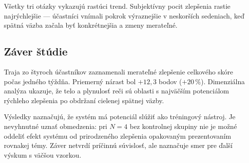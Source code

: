 Všetky tri otázky vykazujú rastúci trend. Subjektívny pocit zlepšenia rastie najrýchlejšie --- účastníci vnímali pokrok výraznejšie v neskorších sedeniach, keď spätná väzba začala byť konkrétnejšia a zmeny merateľné.

\subsection{Záver štúdie}

Traja zo štyroch účastníkov zaznamenali merateľné zlepšenie celkového skóre počas jedného týždňa. Priemerný nárast bol $+12{,}3$ bodov ($+20\,\%$). Dimenziálna analýza ukazuje, že telo a plynulosť reči sú oblasti s najväčším potenciálom rýchleho zlepšenia po obdržaní cielenej spätnej väzby.

Výsledky naznačujú, že systém má potenciál slúžiť ako tréningový nástroj. Je nevyhnutné uznať obmedzenia: pri $N = 4$ bez kontrolnej skupiny nie je možné oddeliť efekt systému od prirodzeného zlepšenia opakovaným prezentovaním rovnakej témy. Záver netvrdí príčinnú súvislosť, ale naznačuje smer pre ďalší výskum s väčšou vzorkou.
